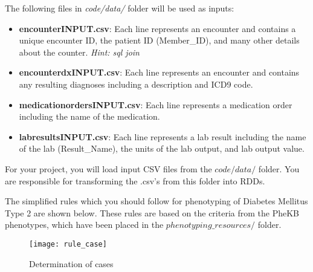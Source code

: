 \documentclass[12pt]{article}
\begin{document}
The following files in \textit{code/data/} folder will be used as inputs:
\begin{itemize}
\item \textbf{encounter\textunderscore INPUT.csv}: Each line represents an encounter and contains a unique encounter ID, the patient ID (Member\_ID), and many other details about the counter. \textit{Hint: sql join}
\item \textbf{encounter\textunderscore dx\textunderscore INPUT.csv}: Each line represents an encounter and contains any resulting diagnoses including a description and ICD9 code.
\item \textbf{medication\textunderscore orders\textunderscore INPUT.csv}: Each line represents a medication order including the name of the medication.
\item \textbf{lab\textunderscore results\textunderscore INPUT.csv}: Each line represents a lab result including the name of the lab (Result\_Name), the units of the lab output, and lab output value.
\end{itemize}
For your project, you will load input CSV files from the $code/data/$ folder. You are responsible for transforming the .csv's from this folder into RDDs.

The simplified rules which you should follow for phenotyping of Diabetes Mellitus Type 2 are shown below. These rules are based on the criteria from the PheKB phenotypes, which have been placed in the $phenotyping\_resources/$ folder.

\begin{figure}[!h]
  \centering
  \texttt{[image: rule\_case]}
  \caption{Determination of cases}
  \label{fig:rule_case}
\end{figure}
\end{document}
